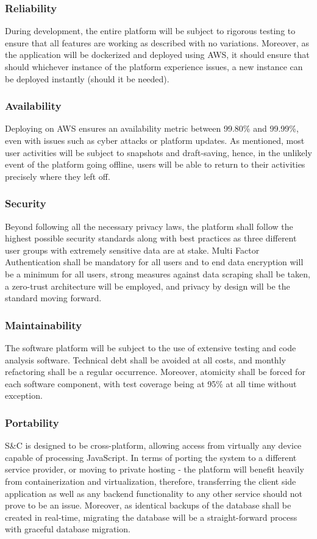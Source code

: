 \subsubsection{Reliability}
During development, the entire platform will be subject to rigorous testing to ensure that all features are working as described with no variations. Moreover, as the application will be dockerized and deployed using AWS, it should ensure that should whichever instance of the platform experience issues, a new instance can be deployed instantly (should it be needed). 
\subsubsection{Availability}
Deploying on AWS ensures an availability metric between 99.80\% and 99.99\%, even with issues such as cyber attacks or platform updates. As mentioned, most user activities will be subject to snapshots and draft-saving, hence, in the unlikely event of the platform going offline, users will be able to return to their activities precisely where they left off.
\subsubsection{Security}
Beyond following all the necessary privacy laws, the platform shall follow the highest possible security standards along with best practices as three different user groups with extremely sensitive data are at stake. Multi Factor Authentication shall be mandatory for all users and to end data encryption will be a minimum for all users, strong measures against data scraping shall be taken, a zero-trust architecture will be employed, and privacy by design will be the standard moving forward.
\subsubsection{Maintainability}
The software platform will be subject to the use of extensive testing and code analysis software. Technical debt shall be avoided at all costs, and monthly refactoring shall be a regular occurrence. Moreover, atomicity shall be forced for each software component, with test coverage being at 95\% at all time without exception.
\subsubsection{Portability}
S&C is designed to be cross-platform, allowing access from virtually any device capable of processing JavaScript. In terms of porting the system to a different service provider, or moving to private hosting - the platform will benefit heavily from containerization and virtualization, therefore, transferring the client side application as well as any backend functionality to any other service should not prove to be an issue. Moreover, as identical backups of the database shall be created in real-time, migrating the database will be a straight-forward process with graceful database migration.
